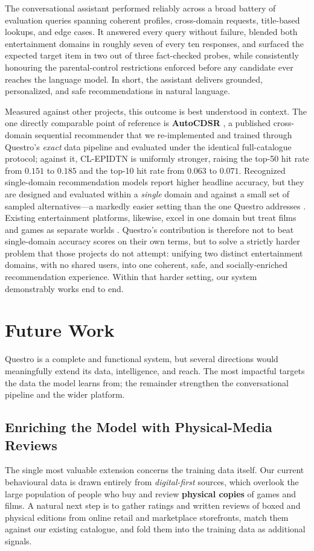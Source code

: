 The conversational assistant performed reliably across a broad battery of evaluation queries spanning coherent profiles, cross-domain requests, title-based lookups, and edge cases. It answered every query without failure, blended both entertainment domains in roughly seven of every ten responses, and surfaced the expected target item in two out of three fact-checked probes, while consistently honouring the parental-control restrictions enforced before any candidate ever reaches the language model. In short, the assistant delivers grounded, personalized, and safe recommendations in natural language.

Measured against other projects, this outcome is best understood in context. The one directly comparable point of reference is \textbf{AutoCDSR} \cite{ju2025autocdsr}, a published cross-domain sequential recommender that we re-implemented and trained through Questro's \emph{exact} data pipeline and evaluated under the identical full-catalogue protocol; against it, CL-EPIDTN is uniformly stronger, raising the top-50 hit rate from $0.151$ to $0.185$ and the top-10 hit rate from $0.063$ to $0.071$. Recognized single-domain recommendation models report higher headline accuracy, but they are designed and evaluated within a \emph{single} domain and against a small set of sampled alternatives---a markedly easier setting than the one Questro addresses \cite{kang2018sasrec, sun2019bert4rec, hidasi2016gru4rec, tang2018caser}. Existing entertainment platforms, likewise, excel in one domain but treat films and games as separate worlds \cite{ref:cross_domain_survey}. Questro's contribution is therefore not to beat single-domain accuracy scores on their own terms, but to solve a strictly harder problem that those projects do not attempt: unifying two distinct entertainment domains, with no shared users, into one coherent, safe, and socially-enriched recommendation experience. Within that harder setting, our system demonstrably works end to end.

\section{Future Work}
Questro is a complete and functional system, but several directions would meaningfully extend its data, intelligence, and reach. The most impactful targets the data the model learns from; the remainder strengthen the conversational pipeline and the wider platform.

\subsection{Enriching the Model with Physical-Media Reviews}
\label{sec:future_physical_reviews}
The single most valuable extension concerns the training data itself. Our current behavioural data is drawn entirely from \emph{digital-first} sources, which overlook the large population of people who buy and review \textbf{physical copies} of games and films. A natural next step is to gather ratings and written reviews of boxed and physical editions from online retail and marketplace storefronts, match them against our existing catalogue, and fold them into the training data as additional signals.

